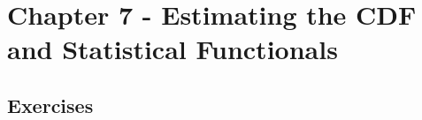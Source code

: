 
\newpage
\section{Chapter 7 - Estimating the CDF and Statistical Functionals}

\subsection*{Exercises}







\begin{comment}

\bigskip\noindent
\textbf{X.X}\\  %


\begin{align*}
    A &= B
\end{align*}


\begin{equation*}
    A = B
    \tag*{\qed}
\end{equation*}


\begin{lstlisting}[style=RSyntax, title=R]
# Code
\end{lstlisting}

\begin{verbatim}
# Output
\end{verbatim}






\begin{figure}[H]
    \begin{minipage}{0.5\textwidth}
    \end{minipage}
    \begin{minipage}{0.5\textwidth}
    \end{minipage}
\end{figure}

\begin{figure}[H]
    \begin{minipage}{0.5\textwidth}
    \begin{center}
        \begin{figure}[H]
            \texttt{[image: IMG1.pdf]}
        \end{figure}
    \end{center}
    \end{minipage}
    \begin{minipage}{0.5\textwidth}
    \begin{center}
        \begin{figure}[H]
            \texttt{[image: IMG2.pdf]}
        \end{figure}
    \end{center}
    \end{minipage}
\end{figure}



\end{comment}
